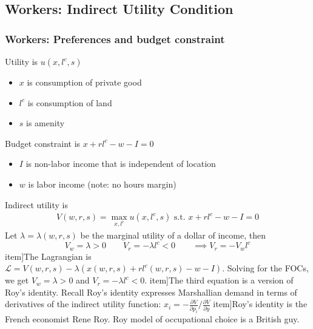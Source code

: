 \documentclass[11pt,notes=hide,aspectratio=169]{beamer}
\begin{document}
\subsection{Workers: Indirect Utility Condition}
\begin{frame}
\frametitle{Workers: Preferences and budget constraint}
Utility is $u(x, l^c, s)$
\begin{itemize}
\item  $x$ is consumption of private good
\item  $l^c$ is consumption of land
\item  $s$ is amenity
\end{itemize}
Budget constraint is $x + rl^c - w - I = 0$
\begin{itemize}
\item $I$ is non-labor income that is independent of location %
\item $w$ is labor income (note: no hours margin)
\end{itemize}
Indirect utility is
\begin{align*}
V(w, r, s)  = \max_{x, l^c} u(x, l^c, s) \text{ s.t. }  x + rl^c - w - I = 0
\end{align*}
Let $\lambda  = \lambda(w, r, s)$ be the marginal utility of a dollar of income, then 
\begin{equation*}
V_w = \lambda >0
\qquad 
V_r = -\lambda l^c <0 
\qquad 
\implies
V_r = - V_w l^c
\end{equation*}
item]{The Lagrangian is $\mathcal{L} = V(w, r, s) - \lambda(x(w, r, s) + rl^c(w, r, s) - w - I)$. Solving for the FOCs, we get $V_w = \lambda >0$ and $V_r = -\lambda l^c <0$.}
item]{The third equation is a version of Roy's identity. Recall Roy's identity expresses Marshallian demand in terms of derivatives of the indirect utility function: $x_{i} = - \frac{\partial V}{\partial p_{i}} / \frac{\partial V}{\partial y}$}
item]{Roy's identity is the French economist Rene Roy. Roy model of occupational choice is a British guy.}
\end{frame}
\end{document}
